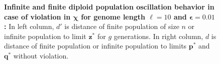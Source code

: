 \begin{figure}[h]
\begin{center}
\hspace{-3em}%
\vspace{-0.5em}  \hspace{-3em}%


\caption{\textbf{Infinite and finite diploid population oscillation behavior in case of violation in $\bm{\chi}$ for genome length $\ell = 10$ and $\bm{\epsilon} = 0.01$:} 
  In left column, $d'$ is distance of finite population of size $n$ or infinite population to limit $\bm{z}^\ast$ for $g$ generations. In right column, $d$ is distance of finite population or infinite population to limits $\bm{p}^\ast$ and $\bm{q}^\ast$ without violation.}
\label{oscillation_10d_vio_chi_0.01}
\end{center}
\end{figure}

